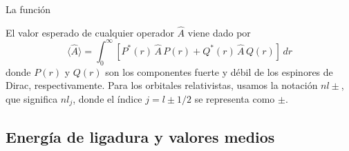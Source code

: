 

La función 


El valor esperado de cualquier operador $\hat{A}$ viene dado por
\begin{equation}
 \langle \hat{A}\rangle =
\int_0^{\infty} \left[ P^*(r) \,\hat{A}\, P(r) + Q^*(r)\, \hat{A}\, Q(r)
\right]\,dr
 \label{eq:meanvalr}
\end{equation}
donde $P(r)$ y $Q(r)$ son los componentes fuerte y débil de los 
espinores de Dirac, respectivamente. Para los orbitales relativistas,
usamos la notación $nl\pm$, que significa $nl_j$, donde el índice 
$j=l\pm1/2$ se representa como $\pm$.

\subsection{Energía de ligadura y valores medios}


